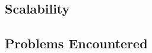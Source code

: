 







\subsection{Scalability}
\label{ch:localisation}




\subsection{Problems Encountered}







